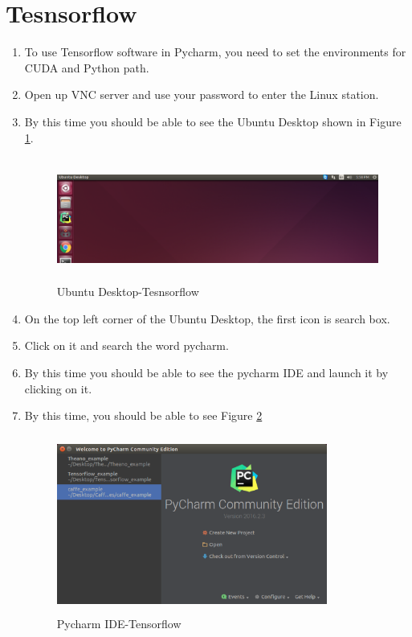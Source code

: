 \documentclass[12pt]{article}
\begin{document}
\section{Tesnsorflow}
\begin{enumerate}
  \item To use Tensorflow software in Pycharm, you need to set the environments for CUDA and Python path.
  \item Open up VNC server and use your password to enter the Linux station.
  \item By this time you should be able to see the Ubuntu Desktop shown in Figure \ref{fig:1_2}.
\begin{figure}[h]
	\centerline{\includegraphics[width=6in, height=1.6in]{fig/1.eps}}
	\caption{Ubuntu Desktop-Tesnsorflow}
	\label{fig:1_2}
\end{figure}
  \item On the top left corner of the Ubuntu Desktop, the first icon is search box.
  \item Click on it and search the word pycharm.
  \item By this time you should be able to see the pycharm IDE and launch it by clicking on it.
  \item By this time, you should be able to see Figure \ref{fig:2_1}
\begin{figure}[h]
	\centerline{\includegraphics[width=3.5in, height=2.3in]{fig/2.eps}}
	\caption{Pycharm IDE-Tensorflow}
	\label{fig:2_1}
\end{figure}

\end{enumerate}
\end{document}
